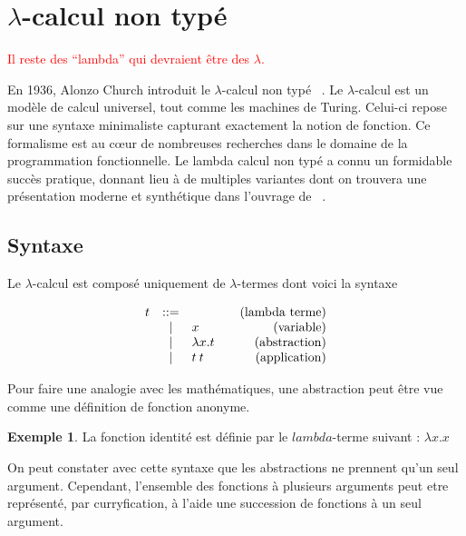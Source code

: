 \documentclass {article}
\makeatletter
\theoremstyle{definition}
\newtheorem{example}{Exemple}
\theoremstyle{remark}
\newcommand{\todo}[1]{\textcolor{red}{#1}}
\newenvironment{bnf}
               {\[\begin{array}{lcl@{\qquad}r}}
               {\end{array}\]}
\makeatother
\begin{document}
\section{$\lambda$-calcul non typé}
\label{sec:untyped}

\todo{Il reste des ``lambda'' qui devraient être des $\lambda$.}

En 1936, Alonzo Church introduit le $\lambda$-calcul non typé
~\citep{church:lambda-calcul}. Le $\lambda$-calcul est
un modèle de calcul universel, tout comme les machines de Turing. Celui-ci repose
sur une syntaxe minimaliste capturant exactement la notion de fonction. Ce formalisme est au c\oe{}ur de nombreuses recherches dans le domaine de la 
programmation fonctionnelle. Le lambda calcul non typé a connu un formidable 
succès pratique, donnant lieu à de multiples variantes dont on trouvera une présentation
 moderne et synthétique dans l'ouvrage de ~\citet{pierce:tapl}.

\subsection{Syntaxe}
Le $\lambda$-calcul est composé uniquement de \(\lambda\)-termes dont voici la syntaxe

\newcommand{\Lam}[2]{\ensuremath{\lambda #1. #2}}
\newcommand{\App}[2]{\ensuremath{#1\:#2}}
\newcommand{\Var}[1]{\ensuremath{#1}}
\newcommand{\Fst}[1]{\ensuremath{#1.\pi_0}}
\newcommand{\Snd}[1]{\ensuremath{#1.\pi_1}}
\newcommand{\Pair}[2]{\ensuremath{(#1, #2)}}

\begin{bnf}
  t &::= & &\mbox{(lambda terme)} \\
  &|& \Var{x} & \mbox{(variable)} \\
  &|& \Lam{x}{t} & \mbox{(abstraction)} \\
  &|& \App{t}{t}          & \mbox{(application)}
\end{bnf}

Pour faire une analogie avec les mathématiques, une abstraction peut
être vue comme une définition de fonction anonyme.
 
\begin{example}
 La fonction identité est définie par le $lambda$-terme suivant : $\Lam{x}{\Var{x}}$
\end{example}

On peut constater avec cette syntaxe que les abstractions ne prennent
qu'un seul argument. Cependant, l'ensemble des fonctions à plusieurs
arguments peut etre représenté, par curryfication, à l'aide une
succession de fonctions à un seul argument.
\end{document}
